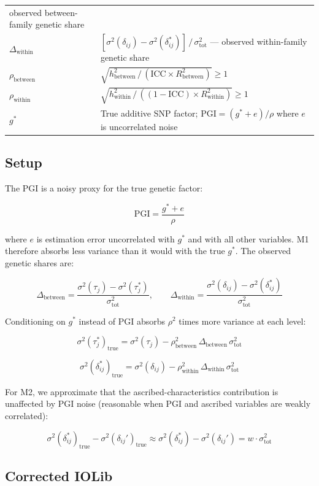 \documentclass[
]{article}
\begin{document}
{\begin{longtable}[]{@{}
  >{\raggedright\arraybackslash}p{}
  >{\raggedright\arraybackslash}p{}@{}}
observed between-family genetic share \\
\(\Delta_\text{within}\) &
\([\sigma^2(\delta_{ij}) - \sigma^2(\delta_{ij}^*)]\,/\,\sigma^2_\text{tot}\)
--- observed within-family genetic share \\
\(\rho_\text{between}\) &
\(\sqrt{h^2_\text{between}\,/\,(\text{ICC} \times R^2_\text{between})} \geq 1\) \\
\(\rho_\text{within}\) &
\(\sqrt{h^2_\text{within}\,/\,((1-\text{ICC}) \times R^2_\text{within})} \geq 1\) \\
\(g^*\) & True additive SNP factor; \(\text{PGI} = (g^* + e)/\rho\)
where \(e\) is uncorrelated noise \\
\end{longtable}
}


\subsection{Setup}\label{setup}

The PGI is a noisy proxy for the true genetic factor:

\[\text{PGI} = \frac{g^* + e}{\rho}\]

where \(e\) is estimation error uncorrelated with \(g^*\) and with all
other variables. M1 therefore absorbs less variance than it would with
the true \(g^*\). The observed genetic shares are:

\[\Delta_\text{between} = \frac{\sigma^2(\tau_j) - \sigma^2(\tau_j^*)}{\sigma^2_\text{tot}}, \qquad \Delta_\text{within} = \frac{\sigma^2(\delta_{ij}) - \sigma^2(\delta_{ij}^*)}{\sigma^2_\text{tot}}\]

Conditioning on \(g^*\) instead of PGI absorbs \(\rho^2\) times more
variance at each level:

\[\sigma^2(\tau_j^*)_\text{true} = \sigma^2(\tau_j) - \rho^2_\text{between}\,\Delta_\text{between}\,\sigma^2_\text{tot}\]

\[\sigma^2(\delta_{ij}^*)_\text{true} = \sigma^2(\delta_{ij}) - \rho^2_\text{within}\,\Delta_\text{within}\,\sigma^2_\text{tot}\]

For M2, we approximate that the ascribed-characteristics contribution is
unaffected by PGI noise (reasonable when PGI and ascribed variables are
weakly correlated):

\[\sigma^2(\delta_{ij}^*)_\text{true} - \sigma^2(\delta_{ij}')_\text{true} \approx \sigma^2(\delta_{ij}^*) - \sigma^2(\delta_{ij}') = w \cdot \sigma^2_\text{tot}\]


\subsection{Corrected IOLib}\label{corrected-iolib}
\end{document}
